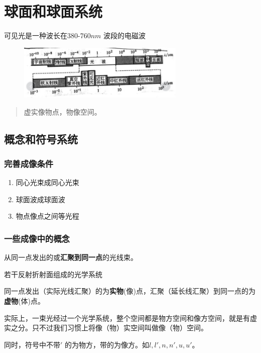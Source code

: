 
\section{球面和球面系统}
可见光是一种波长在380-760$nm$ 波段的电磁波
        \begin{figure}[H]
            \centering
            \includegraphics[width=8cm]{img/0.1.png}
            \end{figure}
\begin{quote}
{\qquad{}\ccwd\kaishu{}
虚实像物点，物像空间。
}
\end{quote}
\subsection{概念和符号系统}
\subsubsection{完善成像条件}
\begin{enumerate}[nosep]%
    \item 同心光束成同心光束
    \item 球面波成球面波
    \item 物点像点之间等光程
\end{enumerate}
\subsubsection{一些成像中的概念}
\begin{description}[leftmargin=1.7cm,style=nextline,nosep]%
    \item[同心光束] 从同一点发出的或\textbf{汇聚到同一点}的光线束。
    \item[光具组] 若干反射折射面组成的光学系统
    \item[虚实像物点] 同一点发出（实际光线汇聚）的为\textbf{实物}(像)点，汇聚（延长线汇聚）到同一点的为\textbf{虚物}(体)点。
    \item[像物方空间] 实际上，一束光经过一个光学系统，整个空间都是物方空间和像方空间，就是有虚实之分。只不过我们习惯上将像（物）实空间叫做像（物）空间。
    
    同时，符号中不带$'$ 的为物方，带的为像方。如$l,l',n,n',u,u'$。
\end{description}
